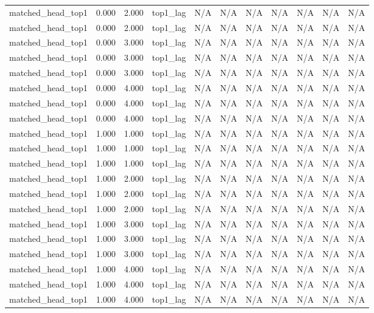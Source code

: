 \begin{table}[h!]
\begin{tabular}{lrrrrrrrrrr}
matched\_head\_top1 & 0.000 & 2.000 & top1\_lag & N/A & N/A & N/A & N/A & N/A & N/A & N/A \\
matched\_head\_top1 & 0.000 & 2.000 & top1\_lag & N/A & N/A & N/A & N/A & N/A & N/A & N/A \\
matched\_head\_top1 & 0.000 & 3.000 & top1\_lag & N/A & N/A & N/A & N/A & N/A & N/A & N/A \\
matched\_head\_top1 & 0.000 & 3.000 & top1\_lag & N/A & N/A & N/A & N/A & N/A & N/A & N/A \\
matched\_head\_top1 & 0.000 & 3.000 & top1\_lag & N/A & N/A & N/A & N/A & N/A & N/A & N/A \\
matched\_head\_top1 & 0.000 & 4.000 & top1\_lag & N/A & N/A & N/A & N/A & N/A & N/A & N/A \\
matched\_head\_top1 & 0.000 & 4.000 & top1\_lag & N/A & N/A & N/A & N/A & N/A & N/A & N/A \\
matched\_head\_top1 & 0.000 & 4.000 & top1\_lag & N/A & N/A & N/A & N/A & N/A & N/A & N/A \\
matched\_head\_top1 & 1.000 & 1.000 & top1\_lag & N/A & N/A & N/A & N/A & N/A & N/A & N/A \\
matched\_head\_top1 & 1.000 & 1.000 & top1\_lag & N/A & N/A & N/A & N/A & N/A & N/A & N/A \\
matched\_head\_top1 & 1.000 & 1.000 & top1\_lag & N/A & N/A & N/A & N/A & N/A & N/A & N/A \\
matched\_head\_top1 & 1.000 & 2.000 & top1\_lag & N/A & N/A & N/A & N/A & N/A & N/A & N/A \\
matched\_head\_top1 & 1.000 & 2.000 & top1\_lag & N/A & N/A & N/A & N/A & N/A & N/A & N/A \\
matched\_head\_top1 & 1.000 & 2.000 & top1\_lag & N/A & N/A & N/A & N/A & N/A & N/A & N/A \\
matched\_head\_top1 & 1.000 & 3.000 & top1\_lag & N/A & N/A & N/A & N/A & N/A & N/A & N/A \\
matched\_head\_top1 & 1.000 & 3.000 & top1\_lag & N/A & N/A & N/A & N/A & N/A & N/A & N/A \\
matched\_head\_top1 & 1.000 & 3.000 & top1\_lag & N/A & N/A & N/A & N/A & N/A & N/A & N/A \\
matched\_head\_top1 & 1.000 & 4.000 & top1\_lag & N/A & N/A & N/A & N/A & N/A & N/A & N/A \\
matched\_head\_top1 & 1.000 & 4.000 & top1\_lag & N/A & N/A & N/A & N/A & N/A & N/A & N/A \\
matched\_head\_top1 & 1.000 & 4.000 & top1\_lag & N/A & N/A & N/A & N/A & N/A & N/A & N/A \\

\end{tabular}
\end{table}
